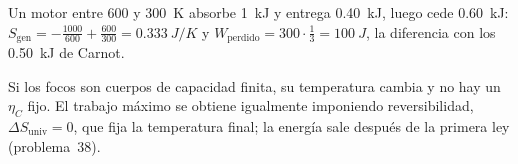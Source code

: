 \begin{ejemplo}
Un motor entre 600 y \SI{300}{K} absorbe \SI{1}{kJ} y entrega \SI{0,40}{kJ}, luego cede \SI{0,60}{kJ}:
$S_{\mathrm{gen}}=-\frac{1000}{600}+\frac{600}{300}=\SI{0,333}{J/K}$ y $W_{\mathrm{perdido}}=300\cdot\tfrac13=\SI{100}{J}$, la
diferencia con los \SI{0,50}{kJ} de Carnot.
\end{ejemplo}

\begin{observacion}
Si los focos son cuerpos de capacidad finita, su temperatura cambia y no hay un $\eta_C$ fijo. El trabajo máximo
se obtiene igualmente imponiendo reversibilidad, $\Delta S_{\mathrm{univ}}=0$, que fija la temperatura final; la
energía sale después de la primera ley (problema~38).
\end{observacion}
